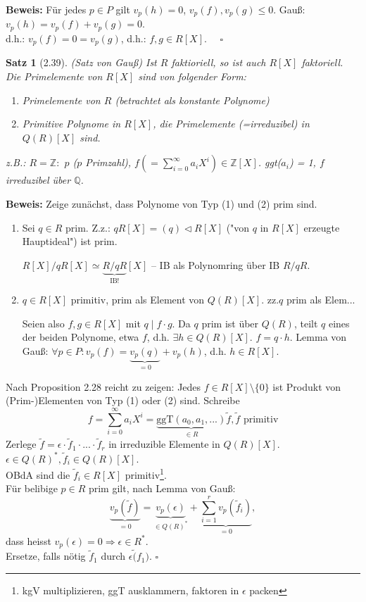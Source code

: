 \documentclass[10pt,a4paper]{article}
\newtheorem{satz}{Satz}
\begin{document}
\textbf{Beweis:} Für jedes $p \in P$ gilt $v_p(h) = 0$, $v_p(f), v_p(g) \leq 0$. Gauß: $v_p(h) = v_p(f) + v_p(g) = 0$.\\
d.h.: $v_p(f) = 0 = v_p(g)$, d.h.: $f,g \in R[X]$. $\quad \square$

\begin{satz}[2.39](Satz von Gauß)
Ist $R$ faktioriell, so ist auch $R[X]$ faktoriell. Die Primelemente von $R[X]$ sind von folgender Form:\begin{enumerate}
\item Primelemente von $R$ (betrachtet als konstante Polynome)
\item Primitive Polynome in $R[X]$, die Primelemente (=irreduzibel) in $Q(R)[X]$ sind. 
\end{enumerate}

z.B.: $R = \mathbb{Z:}$ $p$ ($p$ Primzahl), $f (= \sum_{i=0}^{\infty} a_i X^i) \in \mathbb{Z}[X]$. ggt($a_i$) = 1, $f$ irreduzibel über $\mathbb{Q}$.
\end{satz}

\textbf{Beweis:} Zeige zunächst, dass Polynome von Typ (1) und (2) prim sind.

\begin{enumerate}
\item Sei $q \in R$ prim. Z.z.: $qR[X] = (q) \triangleleft R[X]$ ("von $q$ in $R[X]$ erzeugte Hauptideal") ist prim.

$R[X]/qR[X] \simeq \underbrace{R/qR}_{\text{IB!}}[X]$ -- IB als Polynomring über IB $R/qR$.

\item $q \in R[X]$ primitiv, prim als Element von $Q(R)[X]$. zz.$q$ prim als Elem...

Seien also $f,g \in R[X]$ mit $q \mid f \cdot g$. Da $q$ prim ist über $Q(R)$, teilt $q$ eines der beiden Polynome, etwa $f$, d.h. $\exists h \in Q(R)[X]$. $f = q \cdot h$. Lemma von Gauß: $\forall p \in P: v_p(f) = \underbrace{v_p(q)}_{=0} + v_p(h) $, d.h. $h \in R[X]$.
\end{enumerate}

Nach Proposition 2.28 reicht zu zeigen: Jedes $f \in R[X] \setminus \lbrace 0 \rbrace$ ist Produkt von (Prim-)Elementen von Typ (1) oder (2) sind. Schreibe 
$$f = \sum_{i=0}^\infty a_i X^i = \underbrace{\textrm{ggT}(a_0,a_1,...)}_{\in R} \tilde f, \tilde f\textrm{ primitiv}$$
Zerlege $\tilde f = \epsilon \cdot \tilde f_1 \cdot ... \cdot \tilde f_r$ in irreduzible Elemente in $Q(R)[X]$. $\epsilon \in Q(R)^*, \tilde f_i \in Q(R)[X]$.\\
OBdA sind die $\tilde f_i \in R[X]$ primitiv\footnote{kgV multiplizieren, ggT ausklammern, faktoren in $\epsilon$ packen}.\\
Für belibige $p \in R$ prim gilt, nach Lemma von Gauß:
$$\underbrace{v_p(\tilde f)}_{=0} = \underbrace{v_p(\epsilon)}_{\in Q(R)^*} + \underbrace{\sum_{i=1}^r v_p (\tilde f_i)}_{=0},$$
dass heisst $v_p(\epsilon) = 0 \Rightarrow \epsilon \in R^*$.\\
Ersetze, falls nötig $\tilde f_1$ durch $\epsilon \tilde (f_1)$. $\square$
\end{document}
